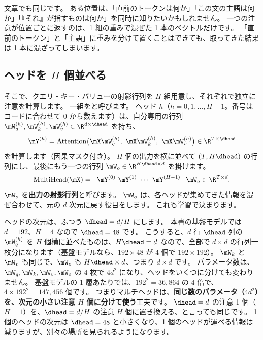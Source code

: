 文章でも同じです。
ある位置は、「直前のトークンは何か」「この文の主語は何か」「『それ』が指すものは何か」を同時に知りたいかもしれません。
一つの注意が位置ごとに返すのは、1 組の重みで混ぜた 1 本のベクトルだけです。
「直前のトークン」と「主語」に重みを分けて置くことはできても、取ってきた結果は 1 本に混ざってしまいます。

\subsection*{ヘッドを $H$ 個並べる}

そこで、クエリ・キー・バリューの射影行列を $H$ 組用意し、それぞれで独立に注意を計算します。
一組をと呼びます。
ヘッド $h$（$h=0,1,\dots,H-1$。番号はコードに合わせて 0 から数えます）は、自分専用の行列 $\mW_q^{(h)},\mW_k^{(h)},\mW_v^{(h)}\in\R^{d\times\dhead}$ を持ち、
\begin{equation}
\mY^{(h)} = \mathrm{Attention}\big(\mX\mW_q^{(h)},\ \mX\mW_k^{(h)},\ \mX\mW_v^{(h)}\big) \in \R^{T\times\dhead}
\end{equation}
を計算します（因果マスク付き）。
$H$ 個の出力を横に並べて $(T, H\dhead)$ の行列にし、最後にもう一つの行列 $\mW_o\in\R^{H\dhead\times d}$ を掛けます。
\begin{equation}
\mathrm{MultiHead}(\mX) = \big[\,\mY^{(0)}\ \mY^{(1)}\ \cdots\ \mY^{(H-1)}\,\big]\,\mW_o \in \R^{T\times d} .
\label{eq:attn-multihead}
\end{equation}
$\mW_o$ を\textbf{出力の射影行列}と呼びます。
$\mW_o$ は、各ヘッドが集めてきた情報を混ぜ合わせて、元の $d$ 次元に戻す役目をします。
これも学習で決まります。

ヘッドの次元は、ふつう $\dhead = d/H$ にします。
本書の基盤モデルでは $d=192$、$H=4$ なので $\dhead=48$ です。
こうすると、$d$ 行 $\dhead$ 列の $\mW_q^{(h)}$ を $H$ 個横に並べたものは、$H\dhead=d$ なので、全部で $d\times d$ の行列一枚分になります（基盤モデルなら、$192\times48$ が 4 個で $192\times192$）。
$\mW_k$ と $\mW_v$ も同じで、$\mW_o$ も $H\dhead\times d$、つまり $d\times d$ です。
パラメータ数は、$\mW_q,\mW_k,\mW_v,\mW_o$ の 4 枚で $4d^2$ になり、ヘッドをいくつに分けても変わりません。
基盤モデルの 1 層あたりでは、$192^2=36{,}864$ の 4 倍で、$4\times192^2=147{,}456$ 個です。
つまりマルチヘッドは、\textbf{同じ数のパラメータ（$4d^2$）を、次元の小さい注意 $H$ 個に分けて使う}工夫です。
$\dhead=d$ の注意 1 個（$H=1$）を、$\dhead=d/H$ の注意 $H$ 個に置き換える、と言っても同じです。
1 個のヘッドの次元は $\dhead=48$ と小さくなり、1 個のヘッドが運べる情報は減りますが、別々の場所を見られるようになります。

